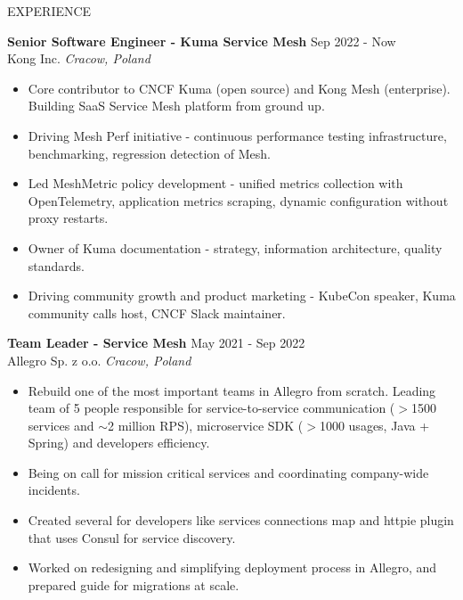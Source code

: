 \documentclass{resume} %
\begin{document}
\begin{rSection}{EXPERIENCE}

\textbf{Senior Software Engineer - Kuma Service Mesh} \hfill Sep 2022 - Now\\
Kong Inc. \hfill \textit{Cracow, Poland}
 \begin{itemize}
    \itemsep -2pt {} 
     \item Core contributor to CNCF Kuma (open source) and Kong Mesh (enterprise). Building SaaS Service Mesh platform from ground up.
     \item Driving Mesh Perf initiative - continuous performance testing infrastructure, benchmarking, regression detection of Mesh.
     \item Led MeshMetric policy development - unified metrics collection with OpenTelemetry, application metrics scraping, dynamic configuration without proxy restarts.
     \item Owner of Kuma documentation - strategy, information architecture, quality standards.
     \item Driving community growth and product marketing - KubeCon speaker, Kuma community calls host, CNCF Slack maintainer.
 \end{itemize}

\textbf{Team Leader - Service Mesh} \hfill May 2021 - Sep 2022\\
Allegro Sp. z o.o. \hfill \textit{Cracow, Poland}
 \begin{itemize}
    \itemsep -2pt {} 
     \item Rebuild one of the most important teams in Allegro from scratch. Leading team of 5 people responsible for service-to-service communication ($>$1500 services and $\sim$2 million RPS), microservice SDK ($>$1000 usages, Java + Spring) and developers efficiency.
     \item Being on call for mission critical services and coordinating company-wide incidents.
     \item Created several for developers like services connections map and httpie  plugin that uses Consul for service discovery.
     \item Worked on redesigning and simplifying deployment process in Allegro, and prepared guide for migrations at scale.
 \end{itemize}
 

\end{rSection}
\end{document}
